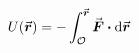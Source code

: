 

\vspace*{\fill}
\centering

\begin{align*}
    U(\va*{r}) = - \int_{\mathcal{O}}^{\va*{r}} \va*{F} \vdot \dd{\va*{r}} 
\end{align*}

\centering
\vspace*{\fill}

